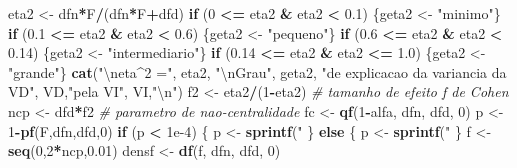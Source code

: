 \documentclass[]{article}
\newenvironment{Shaded}{\begin{snugshade}}{\end{snugshade}}
\newcommand{\KeywordTok}[1]{\textcolor[rgb]{0.13,0.29,0.53}{\textbf{#1}}}
\newcommand{\DecValTok}[1]{\textcolor[rgb]{0.00,0.00,0.81}{#1}}
\newcommand{\FloatTok}[1]{\textcolor[rgb]{0.00,0.00,0.81}{#1}}
\newcommand{\CharTok}[1]{\textcolor[rgb]{0.31,0.60,0.02}{#1}}
\newcommand{\StringTok}[1]{\textcolor[rgb]{0.31,0.60,0.02}{#1}}
\newcommand{\CommentTok}[1]{\textcolor[rgb]{0.56,0.35,0.01}{\textit{#1}}}
\newcommand{\ControlFlowTok}[1]{\textcolor[rgb]{0.13,0.29,0.53}{\textbf{#1}}}
\newcommand{\OperatorTok}[1]{\textcolor[rgb]{0.81,0.36,0.00}{\textbf{#1}}}
\newcommand{\NormalTok}[1]{#1}
\begin{document}
\begin{Shaded}
\begin{Highlighting}[]
\NormalTok{eta2 <-}\StringTok{ }\NormalTok{dfn}\OperatorTok{*}\NormalTok{F}\OperatorTok{/}\NormalTok{(dfn}\OperatorTok{*}\NormalTok{F}\OperatorTok{+}\NormalTok{dfd)}
\ControlFlowTok{if}\NormalTok{ (}\DecValTok{0} \OperatorTok{<=}\StringTok{ }\NormalTok{eta2 }\OperatorTok{&}\StringTok{ }\NormalTok{eta2 }\OperatorTok{<}\StringTok{ }\FloatTok{0.1}\NormalTok{) \{geta2 <-}\StringTok{ "minimo"}\NormalTok{\}}
\ControlFlowTok{if}\NormalTok{ (}\FloatTok{0.1} \OperatorTok{<=}\StringTok{ }\NormalTok{eta2 }\OperatorTok{&}\StringTok{ }\NormalTok{eta2 }\OperatorTok{<}\StringTok{ }\FloatTok{0.6}\NormalTok{) \{geta2 <-}\StringTok{ "pequeno"}\NormalTok{\}}
\ControlFlowTok{if}\NormalTok{ (}\FloatTok{0.6} \OperatorTok{<=}\StringTok{ }\NormalTok{eta2 }\OperatorTok{&}\StringTok{ }\NormalTok{eta2 }\OperatorTok{<}\StringTok{ }\FloatTok{0.14}\NormalTok{) \{geta2 <-}\StringTok{ "intermediario"}\NormalTok{\}}
\ControlFlowTok{if}\NormalTok{ (}\FloatTok{0.14} \OperatorTok{<=}\StringTok{ }\NormalTok{eta2 }\OperatorTok{&}\StringTok{ }\NormalTok{eta2 }\OperatorTok{<=}\StringTok{ }\FloatTok{1.0}\NormalTok{) \{geta2 <-}\StringTok{ "grande"}\NormalTok{\}}
\KeywordTok{cat}\NormalTok{(}\StringTok{"}\CharTok{\textbackslash{}n}\StringTok{eta^2 ="}\NormalTok{, eta2, }\StringTok{"}\CharTok{\textbackslash{}n}\StringTok{Grau"}\NormalTok{, geta2,}
    \StringTok{"de explicacao da variancia da VD"}\NormalTok{, VD,}\StringTok{"pela VI"}\NormalTok{, VI,}\StringTok{"}\CharTok{\textbackslash{}n}\StringTok{"}\NormalTok{)}
\NormalTok{f2 <-}\StringTok{ }\NormalTok{eta2}\OperatorTok{/}\NormalTok{(}\DecValTok{1}\OperatorTok{-}\NormalTok{eta2) }\CommentTok{# tamanho de efeito f de Cohen}
\NormalTok{ncp <-}\StringTok{ }\NormalTok{dfd}\OperatorTok{*}\NormalTok{f2 }\CommentTok{# parametro de nao-centralidade}
\NormalTok{fc <-}\StringTok{ }\KeywordTok{qf}\NormalTok{(}\DecValTok{1}\OperatorTok{-}\NormalTok{alfa, dfn, dfd, }\DecValTok{0}\NormalTok{)}
\NormalTok{p <-}\StringTok{ }\DecValTok{1}\OperatorTok{-}\KeywordTok{pf}\NormalTok{(F,dfn,dfd,}\DecValTok{0}\NormalTok{)}
\ControlFlowTok{if}\NormalTok{ (p }\OperatorTok{<}\StringTok{ }\FloatTok{1e-4}\NormalTok{)}
\NormalTok{\{}
\NormalTok{  p <-}\StringTok{ }\KeywordTok{sprintf}\NormalTok{(}\StringTok{"%.2e"}\NormalTok{,p)}
\NormalTok{\} }\ControlFlowTok{else}
\NormalTok{\{}
\NormalTok{  p <-}\StringTok{ }\KeywordTok{sprintf}\NormalTok{(}\StringTok{"%.4f"}\NormalTok{,p)}
\NormalTok{\}}
\NormalTok{f <-}\StringTok{ }\KeywordTok{seq}\NormalTok{(}\DecValTok{0}\NormalTok{,}\DecValTok{2}\OperatorTok{*}\NormalTok{ncp,}\FloatTok{0.01}\NormalTok{)}
\NormalTok{densf <-}\StringTok{ }\KeywordTok{df}\NormalTok{(f, dfn, dfd, }\DecValTok{0}\NormalTok{)}
}}
\end{Highlighting}
\end{Shaded}
\end{document}
